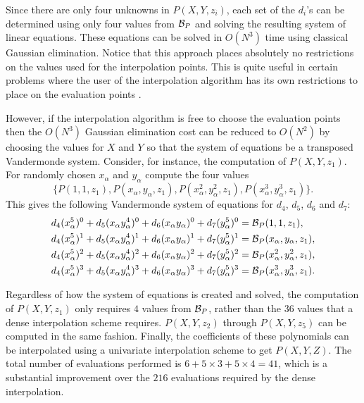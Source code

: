 Since there are only four unknowns in $P(X, Y, z_i)$, each set of the
$d_i$'s can be determined using only four values from ${\cal B}_P$ and
solving the resulting system of linear equations.  These equations can
be solved in $O(N^3)$ time using classical Gaussian elimination.
Notice that this approach places absolutely no restrictions on the
values used for the interpolation points.  This is quite useful in
certain problems where the user of the interpolation algorithm has its
own restrictions to place on the evaluation points \cite{Rubinfeld1994-lq}.

However, if the interpolation algorithm is free to choose the
evaluation points then the $O(N^3)$ Gaussian elimination cost can be
reduced to $O(N^2)$ by choosing the values for $X$ and $Y$ so that the
system of equations be a transposed Vandermonde
system. Consider, for instance,
the computation of $P(X,Y,z_1)$.  For randomly chosen $x_{\alpha}$ and
$y_{\alpha}$ compute the four values
\[
\{P(1,1,z_1), P(x_{\alpha},y_{\alpha},z_1),
  P(x_{\alpha}^2,y_{\alpha}^2,z_1),
  P(x_{\alpha}^3,y_{\alpha}^3,z_1) \}.
\]
This gives the following Vandermonde system of equations for $d_4$,
$d_5$, $d_6$ and $d_7$:
\[
\begin{aligned}
d_4 (x_{\alpha}^5)^0 + d_5 (x_{\alpha} y_{\alpha}^4)^0 +
  d_6 (x_{\alpha} y_{\alpha})^0 + d_7 (y_{\alpha}^5)^0
    & = {\cal B}_P(1,1,z_1), \\
d_4 (x_{\alpha}^5)^1 + d_5 (x_{\alpha} y_{\alpha}^4)^1 +
  d_6 (x_{\alpha} y_{\alpha})^1 + d_7 (y_{\alpha}^5)^1
    & = {\cal B}_P(x_{\alpha},y_{\alpha},z_1), \\
d_4 (x_{\alpha}^5)^2 + d_5 (x_{\alpha} y_{\alpha}^4)^2 +
  d_6 (x_{\alpha} y_{\alpha})^2 + d_7 (y_{\alpha}^5)^2
    & = {\cal B}_P(x_{\alpha}^2,y_{\alpha}^2,z_1), \\
d_4 (x_{\alpha}^5)^3 + d_5 (x_{\alpha} y_{\alpha}^4)^3 +
  d_6 (x_{\alpha} y_{\alpha})^3 + d_7 (y_{\alpha}^5)^3
    & = {\cal B}_P(x_{\alpha}^3,y_{\alpha}^3,z_1).
\end{aligned}
\]

Regardless of how the system of equations is created and solved, the 
computation of $P(X, Y, z_1)$ only requires $4$ values from ${\cal B}_P$,
rather than the $36$ values that a dense interpolation scheme 
requires.  $P(X, Y, z_2)$ through $P(X, Y, z_5)$ can be computed in the
same fashion.  Finally, the coefficients of these polynomials can be
interpolated using a univariate interpolation scheme to get $P(X, Y, Z)$.
The total number of evaluations performed is $6 + 5 \times 3 + 5
\times 4 = 41$, which is a substantial improvement over the $216$
evaluations required by the dense interpolation.

